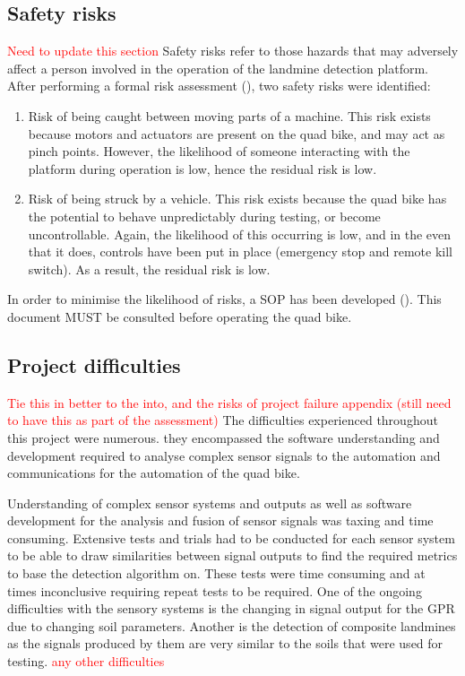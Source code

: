 \documentclass[main.tex]{subfiles}
\begin{document}
\subsection{Safety risks}
\textcolor{red}{Need to update this section}
Safety risks refer to those hazards that may adversely affect a person involved in the operation of the landmine detection platform. After performing a formal risk assessment (), two safety risks were identified:
\begin{enumerate}
\item Risk of being caught between moving parts of a machine. This risk exists because motors and actuators are present on the quad bike, and may act as pinch points. However, the likelihood of someone interacting with the platform during operation is low, hence the residual risk is low.
\item Risk of being struck by a vehicle. This risk exists because the quad bike has the potential to behave unpredictably during testing, or become uncontrollable. Again, the likelihood of this occurring is low, and in the even that it does, controls have been put in place (emergency stop and remote kill switch). As a result, the residual risk is low.
\end{enumerate}
In order to minimise the likelihood of risks, a SOP has been developed (). This document MUST be consulted before operating the quad bike. 
% 

\subsection{Project difficulties}%
\textcolor{red}{Tie this in better to the into, and the risks of project failure appendix (still need to have this as part of the assessment)}
The difficulties experienced throughout this project were numerous. they encompassed the software understanding and development required to analyse complex sensor signals to the automation and communications for the automation of the quad bike. 

Understanding of complex sensor systems and outputs as well as software development for the analysis and fusion of sensor signals was taxing and time consuming. Extensive tests and trials had to be conducted for each sensor system to be able to draw similarities between signal outputs to find the required metrics to base the detection algorithm on. These tests were time consuming and at times inconclusive requiring repeat tests to be required. One of the ongoing difficulties with the sensory systems is the changing in signal output for the GPR due to changing soil parameters. Another is the detection of composite landmines as the signals produced by them are very similar to the soils that were used for testing. \textcolor{red}{any other difficulties}
\end{document}
